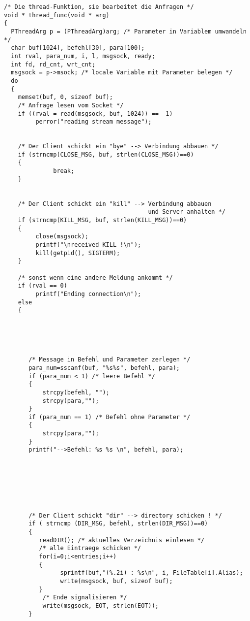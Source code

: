 \begin{verbatim}
/* Die thread-Funktion, sie bearbeitet die Anfragen */
void * thread_func(void * arg)
{
  PThreadArg p = (PThreadArg)arg; /* Parameter in Variablem umwandeln */
  char buf[1024], befehl[30], para[100]; 
  int rval, para_num, i, l, msgsock, ready;
  int fd, rd_cnt, wrt_cnt;
  msgsock = p->msock; /* locale Variable mit Parameter belegen */
  do 
  { 
    memset(buf, 0, sizeof buf);    
    /* Anfrage lesen vom Socket */
    if ((rval = read(msgsock, buf, 1024)) == -1)
         perror("reading stream message");
     

    /* Der Client schickt ein "bye" --> Verbindung abbauen */
    if (strncmp(CLOSE_MSG, buf, strlen(CLOSE_MSG))==0)
    { 
              break;
    } 


    /* Der Client schickt ein "kill" --> Verbindung abbauen 
                                         und Server anhalten */
    if (strncmp(KILL_MSG, buf, strlen(KILL_MSG))==0)
    { 
         close(msgsock);
         printf("\nreceived KILL !\n");
         kill(getpid(), SIGTERM);
    }    
 
    /* sonst wenn eine andere Meldung ankommt */
    if (rval == 0)    
         printf("Ending connection\n");
    else 
    { 





       /* Message in Befehl und Parameter zerlegen */
       para_num=sscanf(buf, "%s%s", befehl, para);
       if (para_num < 1) /* leere Befehl */
       { 
           strcpy(befehl, "");
           strcpy(para,"");
       } 
       if (para_num == 1) /* Befehl ohne Parameter */
       { 
           strcpy(para,"");
       } 
       printf("-->Befehl: %s %s \n", befehl, para);





            

       /* Der Client schickt "dir" --> directory schicken ! */
       if ( strncmp (DIR_MSG, befehl, strlen(DIR_MSG))==0)
       {
          readDIR(); /* aktuelles Verzeichnis einlesen */
          /* alle Eintraege schicken */
          for(i=0;i<entries;i++)
          {
                sprintf(buf,"(%.2i) : %s\n", i, FileTable[i].Alias);
                write(msgsock, buf, sizeof buf);
          }
           /* Ende signalisieren */
           write(msgsock, EOT, strlen(EOT));
       }







\end{verbatim}
